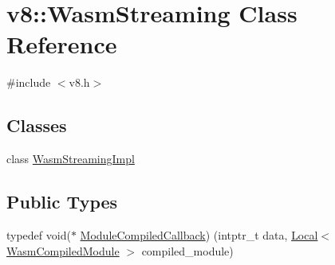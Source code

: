 \hypertarget{classv8_1_1WasmStreaming}{}\section{v8\+:\+:Wasm\+Streaming Class Reference}
\label{classv8_1_1WasmStreaming}


{\ttfamily \#include $<$v8.\+h$>$}

\subsection*{Classes}
\begin{DoxyCompactItemize}
\item 
class \mbox{\hyperlink{classv8_1_1WasmStreaming_1_1WasmStreamingImpl}{Wasm\+Streaming\+Impl}}
\end{DoxyCompactItemize}
\subsection*{Public Types}
\begin{DoxyCompactItemize}
\item 
typedef void($\ast$ \mbox{\hyperlink{classv8_1_1WasmStreaming_a2e8af849348cbd9fe9c3940ab010917d}{Module\+Compiled\+Callback}}) (intptr\+\_\+t data, \mbox{\hyperlink{classv8_1_1Local}{Local}}$<$ \mbox{\hyperlink{classv8_1_1WasmCompiledModule}{Wasm\+Compiled\+Module}} $>$ compiled\+\_\+module)
\end{DoxyCompactItemize}
